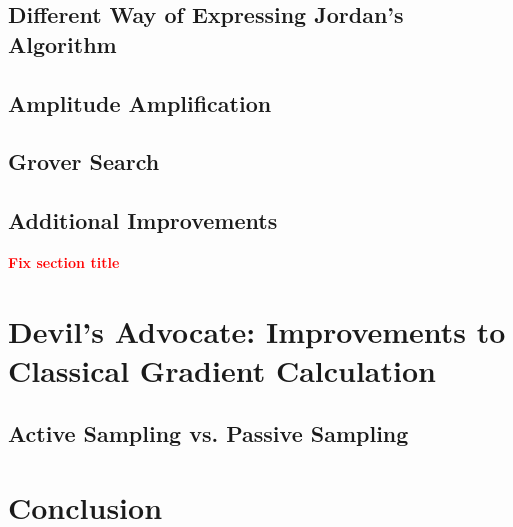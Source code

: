 \documentclass{article}
\begin{document}
\subsection{Different Way of Expressing Jordan's Algorithm}
\subsection{Amplitude Amplification}
\subsection{Grover Search}
\subsection{Additional Improvements}
\textbf{\textcolor{red}{Fix section title}}

\section{Devil's Advocate: Improvements to Classical Gradient Calculation}
\subsection{Active Sampling vs. Passive Sampling}

\section{Conclusion}
\printbibliography
\end{document}
